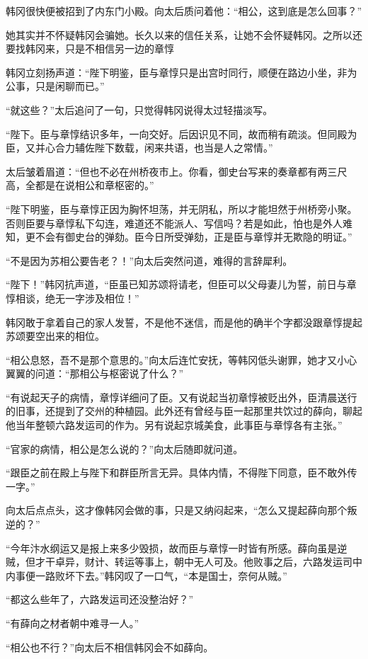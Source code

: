 韩冈很快便被招到了内东门小殿。向太后质问着他：“相公，这到底是怎么回事？”

她其实并不怀疑韩冈会骗她。长久以来的信任关系，让她不会怀疑韩冈。之所以还要找韩冈来，只是不相信另一边的章惇

韩冈立刻扬声道：“陛下明鉴，臣与章惇只是出宫时同行，顺便在路边小坐，非为公事，只是闲聊而已。”

“就这些？”太后追问了一句，只觉得韩冈说得太过轻描淡写。

“陛下。臣与章惇结识多年，一向交好。后因识见不同，故而稍有疏淡。但同殿为臣，又并心合力辅佐陛下数载，闲来共语，也当是人之常情。”

太后皱着眉道：“但也不必在州桥夜市上。你看，御史台写来的奏章都有两三尺高，全都是在说相公和章枢密的。”

“陛下明鉴，臣与章惇正因为胸怀坦荡，并无阴私，所以才能坦然于州桥旁小聚。否则臣要与章惇私下勾连，难道还不能派人、写信吗？若是如此，怕也是外人难知，更不会有御史台的弹劾。臣今日所受弹劾，正是臣与章惇并无欺隐的明证。”

“不是因为苏相公要告老？！”向太后突然问道，难得的言辞犀利。

“陛下！”韩冈抗声道，“臣虽已知苏颂将请老，但臣可以父母妻儿为誓，前日与章惇相谈，绝无一字涉及相位！”

韩冈敢于拿着自己的家人发誓，不是他不迷信，而是他的确半个字都没跟章惇提起苏颂要空出来的相位。

“相公息怒，吾不是那个意思的。”向太后连忙安抚，等韩冈低头谢罪，她才又小心翼翼的问道：“那相公与枢密说了什么？”

“有说起天子的病情，章惇详细问了臣。又有说起当初章惇被贬出外，臣清晨送行的旧事，还提到了交州的种植园。此外还有曾经与臣一起那里共饮过的薛向，聊起他当年整顿六路发运司的作为。另有说起京城美食，此事臣与章惇各有主张。”

“官家的病情，相公是怎么说的？”向太后随即就问道。

“跟臣之前在殿上与陛下和群臣所言无异。具体内情，不得陛下同意，臣不敢外传一字。”

向太后点点头，这才像韩冈会做的事，只是又纳闷起来，“怎么又提起薛向那个叛逆的？”

“今年汴水纲运又是报上来多少毁损，故而臣与章惇一时皆有所感。薛向虽是逆贼，但才干卓异，财计、转运等事上，朝中无人可及。他败事之后，六路发运司中内事便一路败坏下去。”韩冈叹了一口气，“本是国士，奈何从贼。”

“都这么些年了，六路发运司还没整治好？”

“有薛向之材者朝中难寻一人。”

“相公也不行？”向太后不相信韩冈会不如薛向。


